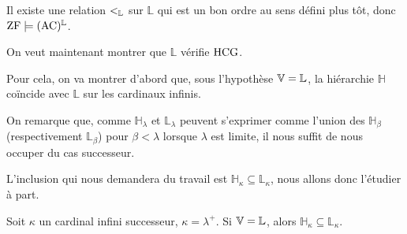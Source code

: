 \begin{corollary}
  Il existe une relation $<_{\mathbb L}$ sur $\mathbb L$ qui est un bon ordre au sens
  défini plus tôt, donc $\operatorname{ZF}\models (\operatorname{AC})^{\mathbb L}$.
\end{corollary}

On veut maintenant montrer que $\mathbb L$ vérifie $\operatorname{HCG}$.

Pour cela, on va montrer d'abord que, sous l'hypothèse $\mathbb V = \mathbb L$, la hiérarchie
$\mathbb H$ coïncide avec $\mathbb L$ sur les cardinaux infinis.

On remarque que, comme $\mathbb H_\lambda$ et $\mathbb L_\lambda$ peuvent
s'exprimer comme l'union des $\mathbb H_\beta$ (respectivement $\mathbb L_\beta$)
pour $\beta < \lambda$ lorsque $\lambda$ est limite, il nous suffit de nous
occuper du cas successeur.

L'inclusion qui nous demandera du travail est
$\mathbb H_\kappa \subseteq\mathbb L_\kappa$, nous allons donc l'étudier à part.

\begin{lemma}
  Soit $\kappa$ un cardinal infini successeur, $\kappa = \lambda^+$. Si
  $\mathbb V = \mathbb L$, alors $\mathbb H_\kappa \subseteq \mathbb L_\kappa$.
\end{lemma}


